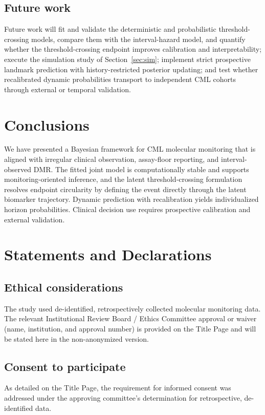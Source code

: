 \documentclass[11pt]{article}
\begin{document}
\subsection{Future work}

Future work will fit and validate the deterministic and probabilistic
threshold-crossing models, compare them with the interval-hazard model,
and quantify whether the threshold-crossing endpoint improves calibration
and interpretability; execute the simulation study of
Section~\ref{sec:sim}; implement strict prospective landmark prediction
with history-restricted posterior updating; and test whether recalibrated
dynamic probabilities transport to independent CML cohorts through external
or temporal validation.

\section{Conclusions}

We have presented a Bayesian framework for CML molecular monitoring that
is aligned with irregular clinical observation, assay-floor reporting, and
interval-observed DMR. The fitted joint model is computationally stable and
supports monitoring-oriented inference, and the latent threshold-crossing
formulation resolves endpoint circularity by defining the event directly
through the latent biomarker trajectory. Dynamic prediction with
recalibration yields individualized horizon probabilities. Clinical
decision use requires prospective calibration and external validation.

\section*{Statements and Declarations}

\subsection*{Ethical considerations}
The study used de-identified, retrospectively collected molecular
monitoring data. The relevant Institutional Review Board / Ethics
Committee approval or waiver (name, institution, and approval number) is
provided on the Title Page and will be stated here in the non-anonymized
version.

\subsection*{Consent to participate}
As detailed on the Title Page, the requirement for informed consent was
addressed under the approving committee's determination for retrospective,
de-identified data.
\end{document}
